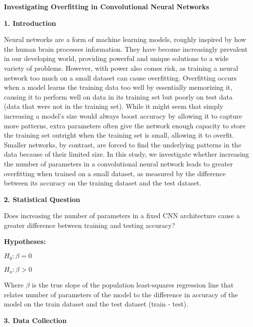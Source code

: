 \documentclass[12pt]{article}
\begin{document}
    \centerline{\textbf{Investigating Overfitting in Convolutional Neural Networks}}

    \noindent\textbf{1. Introduction}

    Neural networks are a form of machine learning models, roughly inspired by how the human brain
    processes information. They have become increasingly prevalent in our developing world, providing
    powerful and unique solutions to a wide variety of problems. However, with power also comes risk,
    as training a neural network too much on a small dataset can cause overfitting. Overfitting occurs
    when a model learns the training data too well by essentially memorizing it, causing it to perform
    well on data in its training set but poorly on test data (data that were not in the training set).
    While it might seem that simply increasing a model’s size would always boost accuracy by allowing it to
    capture more patterns, extra parameters often give the network enough capacity to store the training set
    outright when the training set is small, allowing it to overfit. Smaller networks, by contrast, are forced to find the underlying patterns
    in the data because of their limited size. In this study, we investigate whether increasing the number of
    parameters in a convolutional neural network leads to greater overfitting when trained on a small dataset, as
    measured by the difference between its accuracy on the training dataset and the test dataset.

    \noindent\textbf{2. Statistical Question}

    Does increasing the number of parameters in a fixed CNN architecture cause a greater difference
    between training and testing accuracy?

    \noindent\textbf{Hypotheses:}\newline
    \centerline{$H_0: \beta = 0$} \newline
    \centerline{$H_a: \beta > 0$} \newline
    Where $\beta$ is the true slope of the population least‐squares regression line that relates number
    of parameters of the model to the difference in accuracy of the model on the train dataset and the
    test dataset (train - test).

    \noindent\textbf{3. Data Collection}
\end{document}
